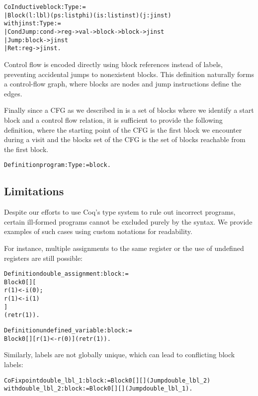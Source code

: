 \begin{alltt}
CoInductive block : Type :=
  | Block (l : lbl) (ps : list phi) (is : list inst) (j : jinst)
with jinst : Type :=
  | CondJump : cond -> reg -> val -> block -> block -> jinst
  | Jump : block -> jinst
  | Ret : reg -> jinst.
\end{alltt}

Control flow is encoded directly using block references instead of labels, preventing accidental jumps to nonexistent blocks. This definition naturally forms a control-flow graph, where blocks are nodes and jump instructions define the edges.

Finally since a CFG as we described in  is a set of blocks where we identify a start block and a control flow relation, it is sufficient to provide the following definition, where the starting point of the CFG is the first block we encounter during a visit and the blocks set of the CFG is the set of blocks reachable from the first block.

\begin{alltt}
Definition program : Type := block.
\end{alltt}

\subsection{Limitations}

Despite our efforts to use Coq's type system to rule out incorrect programs, certain ill-formed programs cannot be excluded purely by the syntax. We provide examples of such cases using custom notations for readability.

For instance, multiple assignments to the same register or the use of undefined registers are still possible:

\begin{alltt}
Definition double_assignment : block :=
  Block 0 [] [
    r(1) <- i(0);
    r(1) <- i(1)
  ]
  (ret r(1)).

Definition undefined_variable : block :=
  Block 0 [] [r(1) <- r(0)] (ret r(1)).
\end{alltt}

Similarly, labels are not globally unique, which can lead to conflicting block labels:

\begin{alltt}
CoFixpoint double_lbl_1 : block := Block 0 [] [] (Jump double_lbl_2)
  with double_lbl_2 : block := Block 0 [] [] (Jump double_lbl_1).
\end{alltt}


